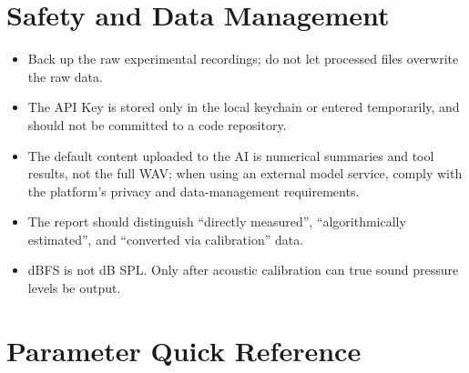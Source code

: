 \documentclass[UTF8,a4paper,12pt]{ctexart}
\begin{document}
\section{Safety and Data Management}

\begin{itemize}
  \item Back up the raw experimental recordings; do not let processed files overwrite the raw data.
  \item The API Key is stored only in the local keychain or entered temporarily, and should not be committed to a code repository.
  \item The default content uploaded to the AI is numerical summaries and tool results, not the full WAV; when using an external model service, comply with the platform's privacy and data-management requirements.
  \item The report should distinguish ``directly measured'', ``algorithmically estimated'', and ``converted via calibration'' data.
  \item dBFS is not dB SPL. Only after acoustic calibration can true sound pressure levels be output.
\end{itemize}

\newpage
\appendix

\section{Parameter Quick Reference}
\end{document}
